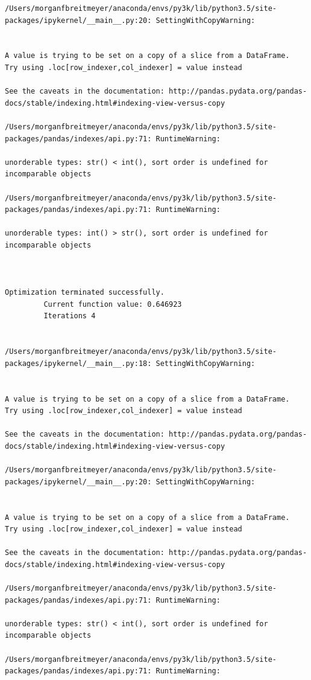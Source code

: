 \begin{lstlisting}
/Users/morganfbreitmeyer/anaconda/envs/py3k/lib/python3.5/site-packages/ipykernel/__main__.py:20: SettingWithCopyWarning:


A value is trying to be set on a copy of a slice from a DataFrame.
Try using .loc[row_indexer,col_indexer] = value instead

See the caveats in the documentation: http://pandas.pydata.org/pandas-docs/stable/indexing.html#indexing-view-versus-copy

/Users/morganfbreitmeyer/anaconda/envs/py3k/lib/python3.5/site-packages/pandas/indexes/api.py:71: RuntimeWarning:

unorderable types: str() < int(), sort order is undefined for incomparable objects

/Users/morganfbreitmeyer/anaconda/envs/py3k/lib/python3.5/site-packages/pandas/indexes/api.py:71: RuntimeWarning:

unorderable types: int() > str(), sort order is undefined for incomparable objects



Optimization terminated successfully.
         Current function value: 0.646923
         Iterations 4


/Users/morganfbreitmeyer/anaconda/envs/py3k/lib/python3.5/site-packages/ipykernel/__main__.py:18: SettingWithCopyWarning:


A value is trying to be set on a copy of a slice from a DataFrame.
Try using .loc[row_indexer,col_indexer] = value instead

See the caveats in the documentation: http://pandas.pydata.org/pandas-docs/stable/indexing.html#indexing-view-versus-copy

/Users/morganfbreitmeyer/anaconda/envs/py3k/lib/python3.5/site-packages/ipykernel/__main__.py:20: SettingWithCopyWarning:


A value is trying to be set on a copy of a slice from a DataFrame.
Try using .loc[row_indexer,col_indexer] = value instead

See the caveats in the documentation: http://pandas.pydata.org/pandas-docs/stable/indexing.html#indexing-view-versus-copy

/Users/morganfbreitmeyer/anaconda/envs/py3k/lib/python3.5/site-packages/pandas/indexes/api.py:71: RuntimeWarning:

unorderable types: str() < int(), sort order is undefined for incomparable objects

/Users/morganfbreitmeyer/anaconda/envs/py3k/lib/python3.5/site-packages/pandas/indexes/api.py:71: RuntimeWarning:


\end{lstlisting}
